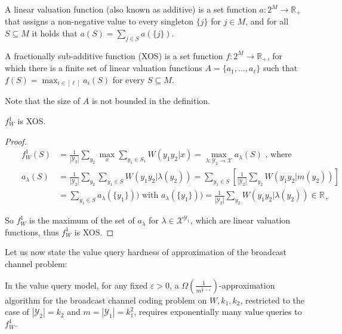 \begin{definition}
  A linear valuation function (also known as additive) is a set function $a : 2^M \rightarrow \mathbb{R}_+$ that assigns a non-negative value to every singleton $\{ j\}$ for $j \in M$, and for all $S \subseteq M$ it holds that $a(S) = \sum_{j \in S} a(\{ j\})$.

  A fractionally sub-additive function (\textrm{XOS}) is a set function $f : 2^M \rightarrow \mathbb{R}_+$, for which there is a finite set of linear valuation functions $A = \{ a_1, \ldots, a_{\ell} \}$ such that $f(S) = \max_{i \in [\ell]} a_i(S)$ for every $S \subseteq M$.
\end{definition}

\begin{rk}
  Note that the size of $A$ is not bounded in the definition. 
\end{rk}

\begin{proposition}
  $f_W^1$ is \textrm{XOS}.
\end{proposition}
\begin{proof}
  \begin{equation}
    \begin{aligned}
      &&f_W^1(S) &= \frac{1}{|\mathcal{Y}_2|}\sum_{y_2} \max_x \sum_{y_1 \in S_1} W(y_1y_2|x) = \max_{\lambda : \mathcal{Y}_2 \rightarrow \mathcal{X}} a_{\lambda}(S) \text{ , where}\\
      &&a_{\lambda}(S) &= \frac{1}{|\mathcal{Y}_2|}\sum_{y_2}  \sum_{y_1 \in S} W(y_1y_2|\lambda(y_2)) = \sum_{y_1 \in S} \left[\frac{1}{|\mathcal{Y}_2|}\sum_{y_2}  W(y_1y_2|m(y_2))\right]\\
      &&&= \sum_{y_1 \in S} a_{\lambda}(\{ y_1 \})) \text{ with } a_{\lambda}(\{ y_1 \})) = \frac{1}{|\mathcal{Y}_2|}\sum_{y_2}  W(y_1y_2|\lambda(y_2)) \in \mathbb{R}_+
      \end{aligned}
  \end{equation}

  So $f_W^1$ is the maximum of the set of $a_{\lambda}$ for $\lambda \in \mathcal{X}^{\mathcal{Y}_1}$, which are linear valuation functions, thus $f_W^1$ is \textrm{XOS}.
\end{proof}

Let us now state the value query hardness of approximation of the broadcast channel problem:
\begin{theorem}
  \label{theo:VQhardnessBC}
  In the value query model, for any fixed $\varepsilon > 0$, a $\Omega\left(\frac{1}{m^{\frac{1}{2}-\varepsilon}}\right)$-approximation algorithm for the broadcast channel coding problem on $W,k_1,k_2$, restricted to the case of $|\mathcal{Y}_2| = k_2$ and $m = |\mathcal{Y}_1| = k_1^2$, requires exponentially many value queries to $f_W^1$.
\end{theorem}

